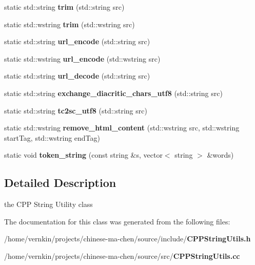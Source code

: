 \begin{CompactItemize}
\item 
static std::string \textbf{trim} (std::string src)\label{classCPPStringUtils_b7a95fcceb8e9f6b6057a18e7b1c2f53}

\item 
static std::wstring \textbf{trim} (std::wstring src)\label{classCPPStringUtils_07879a0daa3a9f7cd25a049748c41db3}

\item 
static std::string \textbf{url\_\-encode} (std::string src)\label{classCPPStringUtils_14302e8f40ec5a1f50438ce2bedf6c5b}

\item 
static std::wstring \textbf{url\_\-encode} (std::wstring src)\label{classCPPStringUtils_57bcbcff310f55d63c05ef58c3fdca9e}

\item 
static std::string \textbf{url\_\-decode} (std::string src)\label{classCPPStringUtils_30f71ace44cdd9bae744c018c36a96a7}

\item 
static std::string \textbf{exchange\_\-diacritic\_\-chars\_\-utf8} (std::string src)\label{classCPPStringUtils_3e08b33f820af5fd7dae1d5f36752883}

\item 
static std::string \textbf{tc2sc\_\-utf8} (std::string src)\label{classCPPStringUtils_24d84b208e576d598d10b6558ca97953}

\item 
static std::wstring \textbf{remove\_\-html\_\-content} (std::wstring src, std::wstring startTag, std::wstring endTag)\label{classCPPStringUtils_4b042a97935f3bc248c10967b45e9fa6}

\item 
static void \textbf{token\_\-string} (const string \&s, vector$<$ string $>$ \&words)\label{classCPPStringUtils_c038f1e9530c1b53edaeea1bb5d8e547}

\end{CompactItemize}


\subsection{Detailed Description}
the CPP String Utility class 

The documentation for this class was generated from the following files:\begin{CompactItemize}
\item 
/home/vernkin/projects/chinese-ma-chen/source/include/{\bf CPPStringUtils.h}\item 
/home/vernkin/projects/chinese-ma-chen/source/src/{\bf CPPStringUtils.cc}\end{CompactItemize}
